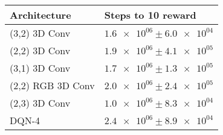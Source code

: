 \begin{tabular}{ll}
\hline
 Architecture      & Steps to 10 reward                \\
\hline
 (3,2) 3D Conv     & $\num{1.6e+06} \pm \num{6.0e+04}$ \\
 (2,2) 3D Conv     & $\num{1.9e+06} \pm \num{4.1e+05}$ \\
 (3,1) 3D Conv     & $\num{1.7e+06} \pm \num{1.3e+05}$ \\
 (2,2) RGB 3D Conv & $\num{2.0e+06} \pm \num{2.4e+05}$ \\
 (2,3) 3D Conv     & $\num{1.0e+06} \pm \num{8.3e+04}$ \\
 DQN-4             & $\num{2.4e+06} \pm \num{8.9e+04}$ \\
\hline
\end{tabular}